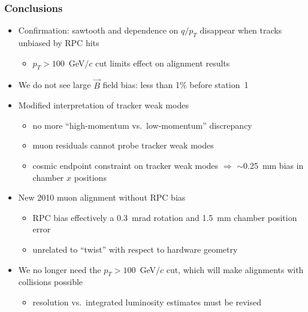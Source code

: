\documentclass[compress]{beamer}
\begin{document}

\begin{frame}
\frametitle{Conclusions}
\begin{itemize}
\item Confirmation: sawtooth and dependence on $q/p_T$ disappear when tracks unbiased by RPC hits
\begin{itemize}
\item $p_T > 100$~GeV/$c$ cut limits effect on alignment results
\end{itemize}

\item We do not see large $\vec{B}$ field bias: less than 1\% before station~1

\item Modified interpretation of tracker weak modes
\begin{itemize}
\item no more ``high-momentum vs.\ low-momentum'' discrepancy
\item muon residuals cannot probe tracker weak modes
\item cosmic endpoint constraint on tracker weak modes $\Rightarrow$
  $\sim$0.25~mm bias in chamber $x$ positions
\end{itemize}

\item New 2010 muon alignment without RPC bias
\begin{itemize}
\item RPC bias effectively a 0.3~mrad rotation and 1.5~mm chamber position error
\item unrelated to ``twist'' with respect to hardware geometry
\end{itemize}

\item We no longer need the $p_T > 100$~GeV/$c$ cut, which will make alignments with collisions possible
\begin{itemize}
\item resolution vs.\ integrated luminosity estimates must be revised
\end{itemize}
\end{itemize}

\label{numpages}
\end{frame}
\end{document}
